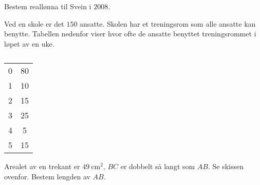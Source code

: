 Bestem reallønna til Svein i $2008$.


\Oppgave[3] 

Ved en skole er det $150$ ansatte. Skolen har et treningsrom som alle ansatte
kan benytte. Tabellen nedenfor viser hvor ofte de ansatte benyttet
treningsrommet i løpet av en uke.

\begin{table}[H]
  \centering
  \caption{}
  \begin{tabular}{| S[table-format=2.0] | S[table-format=2.0] |}
    0 & 80 \\
    1 & 10 \\
    2 & 15 \\
    3 & 25 \\
    4 &  5 \\
    5 & 15 \\ \hline
  \end{tabular}
  \label{tab:del-1-oppgave-1.4}
\end{table}


\Oppgave[2] 

\begin{figure}[H]
  \centering
  \caption{}
  \label{fig:del-1-oppgave-1-5}
\end{figure}

Arealet av en trekant er $\SI{49}{\cm\squared}$, $BC$ er dobbelt så langt som
$AB$. Se skissen ovenfor. Bestem lengden av $AB$.


